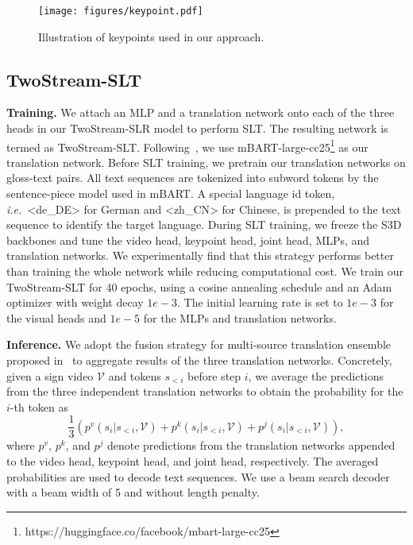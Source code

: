 \documentclass{article}
\def\ie{\emph{i.e.}} \def\Ie{\emph{I.e.}}
\begin{document}
\begin{figure}[t]
\centering
\texttt{[image: figures/keypoint.pdf]}
\caption{Illustration of keypoints used in our approach.}
\label{fig:keypoint}
\end{figure}
\subsection{TwoStream-SLT}
\textbf{Training.} We attach an MLP and a translation network onto each of the three heads in our TwoStream-SLR model to perform SLT. The resulting network is termed as TwoStream-SLT. Following~\cite{MMTLB_2022}, we use mBART-large-cc25\footnote{https://huggingface.co/facebook/mbart-large-cc25} as our translation network. Before SLT training, we pretrain our translation networks on gloss-text pairs. All text sequences are tokenized into subword tokens by the sentence-piece model used in mBART. A special language id token, \ie~<de\_DE> for German and <zh\_CN> for Chinese, is prepended to the text sequence to identify the target language. During SLT training, we freeze the S3D backbones and tune the video head, keypoint head, joint head, MLPs, and translation networks. We experimentally find that this strategy performs better than training the whole network while reducing computational cost. We train our TwoStream-SLT for 40 epochs, using a cosine annealing schedule and an Adam optimizer with weight decay $1e-3$. The initial learning rate is set to $1e-3$ for the visual heads and $1e-5$ for the MLPs and translation networks. 

\textbf{Inference.} We adopt the fusion strategy for multi-source translation ensemble proposed in~\cite{firat2016zero} to aggregate results of the three translation networks. Concretely, given a sign video $\mathcal{V}$ and tokens $s_{<i}$ before step $i$, we average the predictions from the three independent translation networks to obtain the probability for the $i$-th token as
\begin{equation}
\label{eq:fuse_slt}
    \frac{1}{3}\left(p^v(s_i|s_{<i},\mathcal{V})+p^k(s_i|s_{<i},\mathcal{V})+p^j(s_i|s_{<i},\mathcal{V})\right),
\end{equation}
where $p^v$, $p^k$, and $p^j$ denote predictions from the translation networks appended to the video head, keypoint head, and joint head, respectively. The averaged probabilities are used to decode text sequences. We use a beam search decoder with a beam width of 5 and without length penalty.
\end{document}

